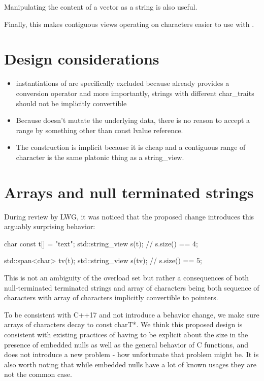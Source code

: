 \documentclass{wg21}
\begin{document}
Manipulating the content of a vector as a string is also useful.

Finally, this makes contiguous views operating on characters easier to use with .


\section{Design considerations}

\begin{itemize}
    \item instantiations of  are specifically excluded because  already provides a conversion operator and more importantly,
    strings with different char_traits should not be implicitly convertible
    \item Because  doesn't mutate the underlying data, there is no reason to accept a range by something other than const lvalue reference.
    \item The construction is implicit because it is cheap and a contiguous range of character is the same platonic thing as a string_view.

\end{itemize}


\section{Arrays and null terminated strings}

During review by LWG, it was noticed that the proposed change introduces this arguably surprising behavior:

\begin{codeblock}

char const t[] = "text";
std::string_view s(t); // s.size() == 4;


std::span<char> tv(t);
std::string_view s(tv); // s.size() == 5;

\end{codeblock}

This is not an ambiguity of the overload set but rather a consequences of both null-terminated terminated strings and array of characters being both
sequence of characters with array of characters implicitly convertible to pointers.

To be consistent with C++17 and not introduce a behavior change, we make sure arrays of characters decay to const charT*.
We think this proposed design is consistent with existing practices of having to be explicit about the size in the presence of embedded nulls as well as the general behavior of C functions, and does not introduce a new problem - how unfortunate that problem might be.
It is also worth noting that while embedded nulls have a lot of known usages they are not the common case.
\end{document}
